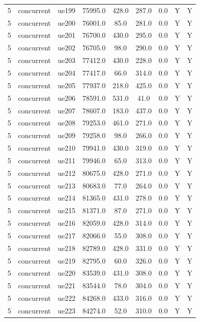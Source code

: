 \begin{table}[ht]
\begin{tabular}{|c|c|c|c|c|c|c|c|c|}
5 & concurrent & ue199 & 75995.0 & 428.0 & 287.0 & 0.0 & Y & Y \\
5 & concurrent & ue200 & 76001.0 & 85.0 & 281.0 & 0.0 & Y & Y \\
5 & concurrent & ue201 & 76700.0 & 430.0 & 295.0 & 0.0 & Y & Y \\
5 & concurrent & ue202 & 76705.0 & 98.0 & 290.0 & 0.0 & Y & Y \\
5 & concurrent & ue203 & 77412.0 & 430.0 & 228.0 & 0.0 & Y & Y \\
5 & concurrent & ue204 & 77417.0 & 66.0 & 314.0 & 0.0 & Y & Y \\
5 & concurrent & ue205 & 77937.0 & 218.0 & 425.0 & 0.0 & Y & Y \\
5 & concurrent & ue206 & 78591.0 & 531.0 & 41.0 & 0.0 & Y & Y \\
5 & concurrent & ue207 & 78607.0 & 183.0 & 437.0 & 0.0 & Y & Y \\
5 & concurrent & ue208 & 79253.0 & 461.0 & 271.0 & 0.0 & Y & Y \\
5 & concurrent & ue209 & 79258.0 & 98.0 & 266.0 & 0.0 & Y & Y \\
5 & concurrent & ue210 & 79941.0 & 430.0 & 319.0 & 0.0 & Y & Y \\
5 & concurrent & ue211 & 79946.0 & 65.0 & 313.0 & 0.0 & Y & Y \\
5 & concurrent & ue212 & 80675.0 & 428.0 & 271.0 & 0.0 & Y & Y \\
5 & concurrent & ue213 & 80683.0 & 77.0 & 264.0 & 0.0 & Y & Y \\
5 & concurrent & ue214 & 81365.0 & 431.0 & 278.0 & 0.0 & Y & Y \\
5 & concurrent & ue215 & 81371.0 & 87.0 & 271.0 & 0.0 & Y & Y \\
5 & concurrent & ue216 & 82059.0 & 428.0 & 314.0 & 0.0 & Y & Y \\
5 & concurrent & ue217 & 82066.0 & 55.0 & 308.0 & 0.0 & Y & Y \\
5 & concurrent & ue218 & 82789.0 & 428.0 & 331.0 & 0.0 & Y & Y \\
5 & concurrent & ue219 & 82795.0 & 60.0 & 326.0 & 0.0 & Y & Y \\
5 & concurrent & ue220 & 83539.0 & 431.0 & 308.0 & 0.0 & Y & Y \\
5 & concurrent & ue221 & 83544.0 & 78.0 & 304.0 & 0.0 & Y & Y \\
5 & concurrent & ue222 & 84268.0 & 433.0 & 316.0 & 0.0 & Y & Y \\
5 & concurrent & ue223 & 84274.0 & 52.0 & 310.0 & 0.0 & Y & Y \\

\end{tabular}
\end{table}
